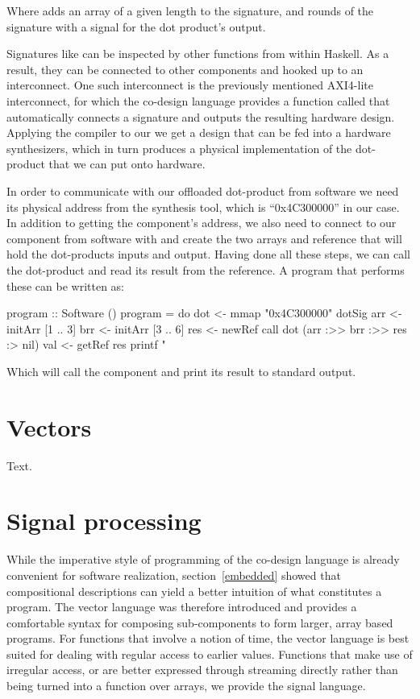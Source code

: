 \documentclass[../paper.tex]{subfiles}
\begin{document}
\noindent Where  adds an array of a given length to the signature, and  rounds of the signature with a signal for the dot product's output.

Signatures like  can be inspected by other functions from within Haskell. As a result, they can be connected to other components and hooked up to an interconnect. One such interconnect is the previously mentioned AXI4-lite interconnect, for which the co-design language provides a function called  that automatically connects a signature and outputs the resulting hardware design. Applying the compiler to our  we get a design that can be fed into a hardware synthesizers, which in turn produces a physical implementation of the dot-product that we can put onto hardware.

In order to communicate with our offloaded dot-product from software we need its physical address from the synthesis tool, which is ``0x4C300000'' in our case. In addition to getting the component's address, we also need to connect to our component from software with  and create the two arrays and reference that will hold the dot-products inputs and output. Having done all these steps, we can call the dot-product and read its result from the reference. A program that performs these can be written as:

\begin{code}
program :: Software ()
program = do
  dot <- mmap "0x4C300000" dotSig
  arr <- initArr [1 .. 3]
  brr <- initArr [3 .. 6]
  res <- newRef
  call dot (arr :>> brr :>> res :> nil)
  val <- getRef res
  printf "%
\end{code}

\noindent Which will call the component and print its result to standard output.

\section{Vectors}

Text.

\section{Signal processing}

\label{signals}

While the imperative style of programming of the co-design language is already convenient for software realization, section~\ref{embedded} showed that compositional descriptions can yield a better intuition of what constitutes a program. The vector language was therefore introduced and provides a comfortable syntax for composing sub-components to form larger, array based programs. For functions that involve a notion of time, the vector language is best suited for dealing with regular access to earlier values. Functions that make use of irregular access, or are better expressed through streaming directly rather than being turned into a function over arrays, we provide the signal language.
\end{document}

